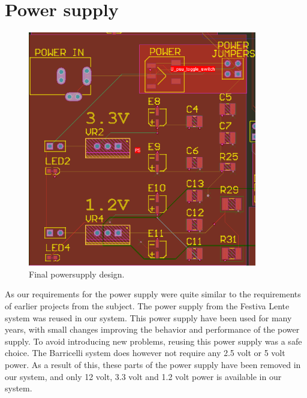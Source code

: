 \section {Power supply}

\begin{figure}
\centering
\includegraphics[width=10cm,keepaspectratio]{pcb/powersuplyphoto.png}
\caption{Final powersupply design. }
\label{figure:powersuplyphoto}
\end{figure}


As our requirements for the power supply were quite similar to the requirements of earlier projects from the subject.
The power supply from the Festiva Lente system was reused in our system.
This power supply have been used for many years, with small changes improving the behavior and performance of the power supply.
To avoid introducing new problems, reusing this power supply was a safe choice.
The Barricelli system does however not require any 2.5 volt or 5 volt power.
As a result of this, these parts of the power supply have been removed in our system, and only 12 volt, 3.3 volt and 1.2 volt power is available in our system.



